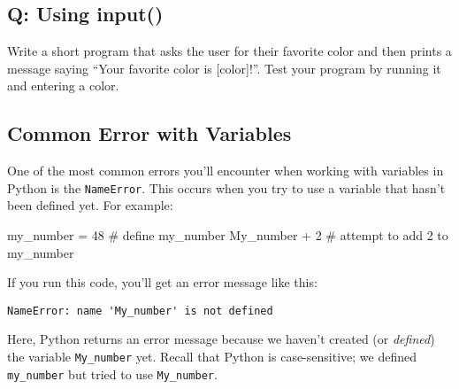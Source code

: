 \documentclass[
  letterpaper,
  DIV=11,
  numbers=noendperiod]{scrreprt}
\newenvironment{Shaded}{\begin{snugshade}}{\end{snugshade}}
\newcommand{\CommentTok}[1]{\textcolor[rgb]{0.37,0.37,0.37}{#1}}
\newcommand{\DecValTok}[1]{\textcolor[rgb]{0.68,0.00,0.00}{#1}}
\newcommand{\NormalTok}[1]{\textcolor[rgb]{0.00,0.23,0.31}{#1}}
\newcommand{\OperatorTok}[1]{\textcolor[rgb]{0.37,0.37,0.37}{#1}}
\begin{document}
\begin{tcolorbox}[enhanced jigsaw, colframe=quarto-callout-tip-color-frame, opacityback=0, titlerule=0mm, bottomrule=.15mm, breakable, leftrule=.75mm, colbacktitle=quarto-callout-tip-color!10!white, title=\textcolor{quarto-callout-tip-color}{\faLightbulb}\hspace{0.5em}{Practice}, rightrule=.15mm, coltitle=black, opacitybacktitle=0.6, colback=white, left=2mm, arc=.35mm, toptitle=1mm, bottomtitle=1mm, toprule=.15mm]

\subsection{Q: Using input()}\label{q-using-input}

Write a short program that asks the user for their favorite color and
then prints a message saying ``Your favorite color is {[}color{]}!''.
Test your program by running it and entering a color.

\end{tcolorbox}

\subsection{Common Error with
Variables}\label{common-error-with-variables}

One of the most common errors you'll encounter when working with
variables in Python is the \texttt{NameError}. This occurs when you try
to use a variable that hasn't been defined yet. For example:

\begin{Shaded}
\begin{Highlighting}[]
\NormalTok{my\_number }\OperatorTok{=} \DecValTok{48}  \CommentTok{\# define \textasciigrave{}my\_number\textasciigrave{}}
\NormalTok{My\_number }\OperatorTok{+} \DecValTok{2}  \CommentTok{\# attempt to add 2 to \textasciigrave{}my\_number\textasciigrave{}}
\end{Highlighting}
\end{Shaded}

If you run this code, you'll get an error message like this:

\begin{verbatim}
NameError: name 'My_number' is not defined
\end{verbatim}

Here, Python returns an error message because we haven't created (or
\emph{defined}) the variable \texttt{My\_number} yet. Recall that Python
is case-sensitive; we defined \texttt{my\_number} but tried to use
\texttt{My\_number}.
\end{document}
